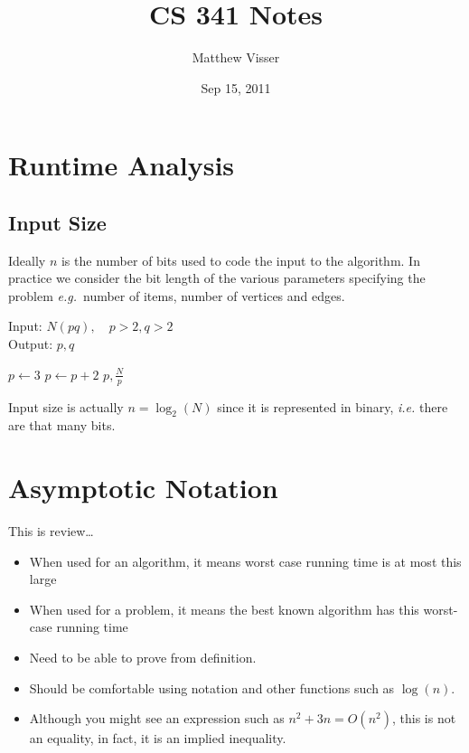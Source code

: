 \documentclass[12pt]{article}
\begin{document}
\title{CS 341 Notes}
\author{Matthew Visser}
\date{Sep 15, 2011}
\maketitle

\section{Runtime Analysis}


\subsection{Input Size}

Ideally $n$ is the number of bits used to code the input to the algorithm.
In practice we consider the bit length of the various parameters specifying the
problem \textit{e.g.}\ number of items, number of vertices and edges.

Input: $N( pq ),\quad p>2, q>2$\\
Output: $p,q$

\begin{algorithmic}
    \STATE $p \gets 3$
        \STATE $p \gets p + 2$
    \ENDWHILE
    \RETURN $p, \frac{N}{p}$
\end{algorithmic}

Input size is actually $n = \log_2(N)$ since it is represented in binary,
\textit{i.e.} there are that many bits.

\section{Asymptotic Notation}

This is review\dots

\begin{itemize}
    \item When used for an algorithm, it means worst case running time is at
        most this large
    \item When used for a problem, it means the best known algorithm has this
        worst-case running time
    \item Need to be able to prove from definition.
    \item Should be comfortable using notation and other functions such as
        $\log(n)$.
    \item Although you might see an expression such as $n^2 + 3n = O(n^2)$,
        this is not an equality, in fact, it is an implied inequality.
\end{itemize}
\end{document}
